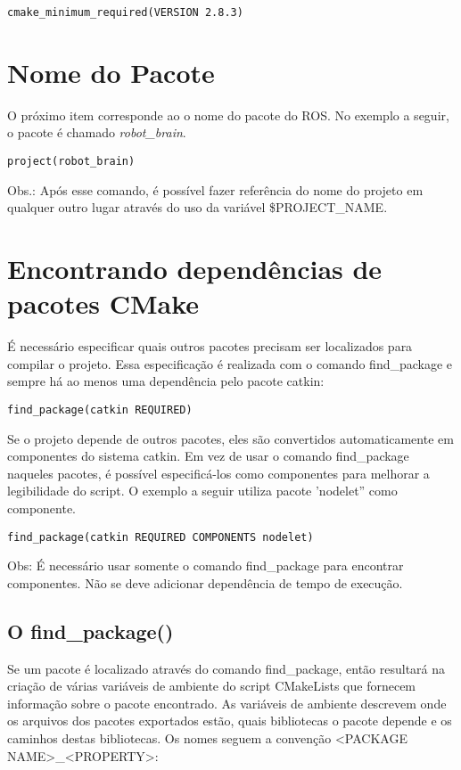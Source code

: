 \begin{verbatim} 
cmake_minimum_required(VERSION 2.8.3)
\end{verbatim}

\section{Nome do Pacote}

O próximo item corresponde ao o nome do pacote do ROS. No exemplo a seguir, o pacote é chamado \textit{robot\_brain}.

\begin{verbatim} 
project(robot_brain)
\end{verbatim}

Obs.: Após esse comando, é possível fazer referência do nome do projeto em qualquer outro lugar através do uso da variável \${PROJECT\_NAME}.

\section{Encontrando dependências de pacotes CMake}

É necessário especificar quais outros pacotes precisam ser localizados para compilar o projeto. Essa especificação é realizada com o comando find\_package e sempre há ao menos uma dependência pelo pacote catkin:

\begin{verbatim} 
find_package(catkin REQUIRED)
\end{verbatim}

Se o projeto depende de outros pacotes, eles são convertidos automaticamente em componentes do sistema catkin. Em vez de usar o comando  find\_package naqueles pacotes, é possível especificá-los como componentes para melhorar a legibilidade do script. O exemplo a seguir utiliza pacote 'nodelet'' como componente.

\begin{verbatim} 
find_package(catkin REQUIRED COMPONENTS nodelet)
\end{verbatim}

Obs: É necessário usar somente o comando find\_package para encontrar componentes. Não se deve adicionar dependência de tempo de execução.

\subsection{O find\_package()}

Se um pacote é localizado através do comando find\_package, então resultará na criação de várias variáveis de ambiente do script CMakeLists que fornecem informação sobre o pacote encontrado. As variáveis de ambiente descrevem onde os arquivos dos pacotes exportados estão, quais bibliotecas o pacote depende e os caminhos destas bibliotecas. Os nomes seguem a convenção <PACKAGE NAME>\_<PROPERTY>:

